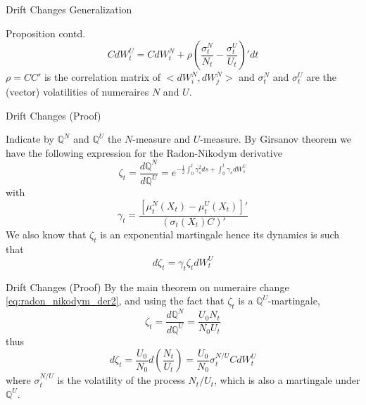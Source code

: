 \documentclass{beamer}
\begin{document}
\begin{frame}{Drift Changes Generalization}
	\begin{block}{Proposition contd.}
		\begin{equation}
			CdW^U_t = CdW^N_t + \rho\left(\frac{\sigma^N_t}{N_t}-\frac{\sigma^U_t}{U_t}\right)' dt
		\end{equation}
		$\rho=CC'$ is the correlation matrix of $<dW^N_i,dW^N_j>$ and $\sigma^N_t$ and $\sigma^U_t$ are the (vector) volatilities of numeraires $N$ and $U$. %
	\end{block}
\end{frame}

\begin{frame}{Drift Changes (Proof)}
  
  Indicate by $\mathbb{Q}^N$ and $\mathbb{Q}^U$ the $N$-measure and $U$-measure. By Girsanov theorem we have the following expression for the Radon-Nikodym derivative
  \begin{equation*}
    \zeta_t = \frac{d\mathbb{Q}^N}{d\mathbb{Q}^U} = e^{-\frac{1}{2}\int_0^t\gamma_s^2 ds + \int_0^t\gamma_s dW_s^U}
  \end{equation*}
  with 
  \begin{equation}
    \gamma_t=\frac{[\mu^N_t(X_t)-\mu_t^U(X_t)]'}{(\sigma_t(X_t)C)'}
    \label{eq:gamma_t}
  \end{equation}
	\pause
  We also know that $\zeta_t$ is an exponential martingale hence its dynamics is such that 
  \begin{equation}
    d\zeta_t=\gamma_t\zeta_tdW_t^U
    \label{eq:dzeta1}
  \end{equation}
\end{frame}

\begin{frame}{Drift Changes (Proof)}
  By the main theorem on numeraire change \cref{eq:radon_nikodym_der2}, and using the fact that $\zeta_t$ is a $\mathbb{Q}^U$-martingale, 
  \begin{equation}
    \zeta_t = \frac{d\mathbb{Q}^N}{d\mathbb{Q}^U} = \frac{U_0N_t}{N_0U_t}
    \label{eq:zeta_numeraire}
  \end{equation}
  thus
  \begin{equation}
    d\zeta_t= \frac{U_0}{N_0}d\left(\frac{N_t}{U_t}\right)= \frac{U_0}{N_0}\sigma_t^{N/U}CdW_t^U
    \label{eq:dzeta2}
  \end{equation}
  where $\sigma^{N/U}_t$ is the volatility of the process $N_t/U_t$, which is also a martingale under $\mathbb{Q}^U$.
\end{frame}
  
\end{document}

